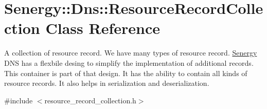 \hypertarget{class_senergy_1_1_dns_1_1_resource_record_collection}{\section{Senergy\-:\-:Dns\-:\-:Resource\-Record\-Collection Class Reference}
\label{class_senergy_1_1_dns_1_1_resource_record_collection}
}


A collection of resource record. We have many types of resource record. \hyperlink{namespace_senergy}{Senergy} D\-N\-S has a flexbile desing to simplify the implementation of additional records. This container is part of that design. It has the ability to contain all kinds of resource records. It also helps in serialization and deserialization.  




{\ttfamily \#include $<$resource\-\_\-record\-\_\-collection.\-h$>$}

